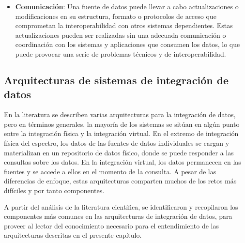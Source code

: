 \begin{itemize}
            \item \textbf{Comunicación}: Una fuente de datos puede llevar a cabo actualizaciones o modificaciones en su estructura, formato o protocolos de acceso que comprometan la interoperabilidad con otros sistemas dependientes. Estas actualizaciones pueden ser realizadas sin una adecuada comunicación o coordinación con los sistemas y aplicaciones que consumen los datos, lo que puede provocar una serie de problemas técnicos y de interoperabilidad.
        \end{itemize}


\subsection{Arquitecturas de sistemas de integraci\'on de datos}

    En la literatura se describen varias arquitecturas para la integración de datos, pero en términos generales, la mayoría de los sistemas se sitúan en algún punto entre la integración física y la integración virtual. 
    En el extremo de integración física del espectro, los datos de las fuentes de datos individuales se cargan y materializan en un repositorio de datos físico, donde se puede responder a las consultas sobre los datos. 
    En la integración virtual, los datos permanecen en las fuentes y se accede a ellos en el momento de la consulta. A pesar de las diferencias de enfoque, estas arquitecturas comparten muchos de los retos más difíciles
    y por tanto componentes. 

    A partir del análisis de la literatura científica, se identificaron y recopilaron los componentes más comunes en las arquitecturas de integración de datos, para proveer al lector
    del conocimiento necesario para el entendimiento de las arquitecturas descritas en el presente capítulo.

